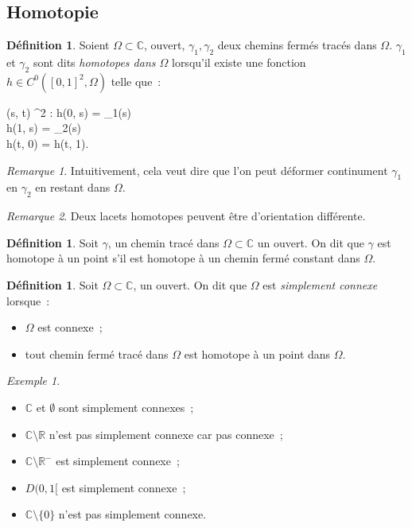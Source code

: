 \documentclass{report}
\theoremstyle{definition}
\newtheorem{déf}[thm]{Définition}
\theoremstyle{remark}
\newtheorem*{rmq}{Remarque}
\newtheorem{ex}{Exemple}[chapter]
\numberwithin{equation}{section}
\newcommand{\C}{\mathbb C}
\newcommand{\R}{\mathbb R}
\begin{document}
		\subsection{Homotopie}
			\begin{déf} Soient $\Omega \subset \C$, ouvert, $\gamma_1, \gamma_2$ deux chemins fermés tracés dans $\Omega$. $\gamma_1$ et $\gamma_2$ sont dits
			\textit{homotopes dans $\Omega$} lorsqu'il existe une fonction $h \in C^0([0, 1]^2, \Omega)$ telle que~:
			\begin{subnumcases}
				{\forall (s, t) \in [0, 1]^2 : }
					h(0, s) = \gamma_1(s) \\
					h(1, s) = \gamma_2(s) \\
					h(t, 0) = h(t, 1).
			\end{subnumcases}
			\end{déf}

			\begin{rmq} Intuitivement, cela veut dire que l'on peut déformer continument $\gamma_1$ en $\gamma_2$ en restant dans $\Omega$.
			\end{rmq}

			\begin{rmq} Deux lacets homotopes peuvent être d'orientation différente.
			\end{rmq}

			\begin{déf} Soit $\gamma$, un chemin tracé dans $\Omega \subset \C$ un ouvert. On dit que $\gamma$ est homotope à un point s'il est homotope à un chemin
			fermé constant dans $\Omega$.
			\end{déf}

			\begin{déf} Soit $\Omega \subset \C$, un ouvert. On dit que $\Omega$ est \textit{simplement connexe} lorsque~:
			\begin{itemize}
				\item $\Omega$ est connexe~;
				\item tout chemin fermé tracé dans $\Omega$ est homotope à un point dans $\Omega$.
			\end{itemize}
			\end{déf}

			\begin{ex}~
			\begin{itemize}
				\item $\C$ et $\emptyset$ sont simplement connexes~;
				\item $\C \setminus \R$ n'est pas simplement connexe car pas connexe~;
				\item $\C \setminus \R^-$ est simplement connexe~;
				\item $D(0, 1[$ est simplement connexe~;
				\item $\C \setminus \{0\}$ n'est pas simplement connexe.
			\end{itemize}
			\end{ex}
\end{document}
